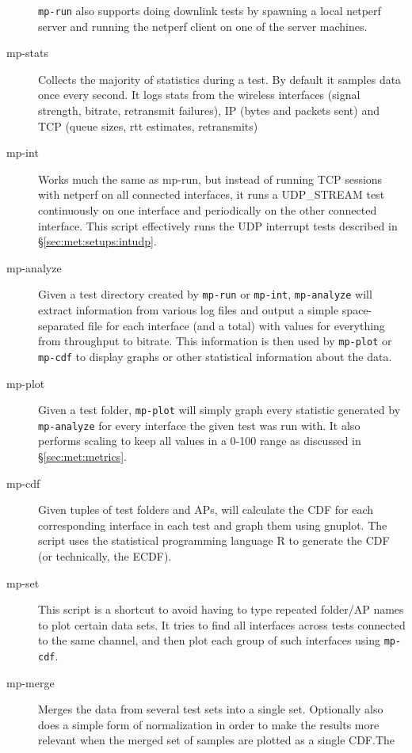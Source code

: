 \begin{description}
    \texttt{mp-run} also supports doing downlink tests by spawning a local
    netperf server and running the netperf client on one of the server machines.
  \item[mp-stats]
    Collects the majority of statistics during a test. By default it samples
    data once every second. It logs stats from the wireless interfaces (signal
    strength, bitrate, retransmit failures), IP (bytes and packets sent) and TCP
    (queue sizes, rtt estimates, retransmits)
  \item[mp-int]
    Works much the same as mp-run, but instead of running TCP sessions with
    netperf on all connected interfaces, it runs a UDP\_STREAM test continuously
    on one interface and periodically on the other connected interface. This
    script effectively runs the UDP interrupt tests described in
    \S\ref{sec:met:setups:intudp}.
  \item[mp-analyze]
    Given a test directory created by \texttt{mp-run} or \texttt{mp-int},
    \texttt{mp-analyze} will extract information from various log files and
    output a simple space-separated file for each interface (and a total) with
    values for everything from throughput to bitrate. This information is then
    used by \texttt{mp-plot} or \texttt{mp-cdf} to display graphs or other
    statistical information about the data.
  \item[mp-plot]
    Given a test folder, \texttt{mp-plot} will simply graph every statistic
    generated by \texttt{mp-analyze} for every interface the given test was run
    with. It also performs scaling to keep all values in a 0-100 range as
    discussed in \S\ref{sec:met:metrics}.
  \item[mp-cdf]
    Given tuples of test folders and APs, will calculate the CDF for each
    corresponding interface in each test and graph them using gnuplot. The
    script uses the statistical programming language R to generate the CDF (or
    technically, the ECDF).
  \item[mp-set]
    This script is a shortcut to avoid having to type repeated folder/AP
    names to plot certain data sets. It tries to find all interfaces across
    tests connected to the same channel, and then plot each group of such
    interfaces using \texttt{mp-cdf}.
  \item[mp-merge]
    Merges the data from several test sets into a single set. Optionally also
    does a simple form of normalization in order to make the results more
    relevant when the merged set of samples are plotted as a single CDF.\@ The

\end{description}
